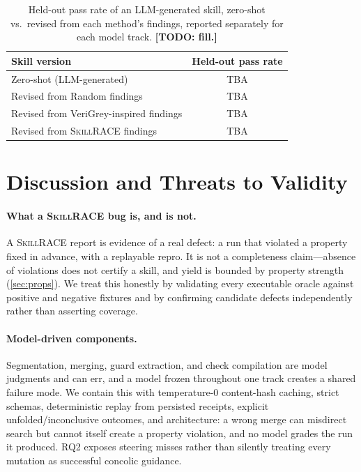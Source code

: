 \documentclass[acmsmall,screen,review,anonymous]{acmart}
\newcommand{\todo}[1]{{\color{purple}\textbf{[TODO: #1]}}}
\newcommand{\ph}[1]{{\color{blue}#1}} %
\newcommand{\tool}{\textsc{SkillRACE}\xspace}
\newcommand{\PassZeroShot}{\ph{TBA}}
\newcommand{\PassRandom}{\ph{TBA}}
\newcommand{\PassGreybox}{\ph{TBA}}
\newcommand{\PassSkillrace}{\ph{TBA}}
\begin{document}
\begin{table}[t]
\centering\small
\caption{Held-out pass rate of an LLM-generated skill, zero-shot vs.\ revised from each
method's findings, reported separately for each model track. \todo{fill.}}
\label{tab:rq3}
\begin{tabular}{@{}l c@{}}
\toprule
\textbf{Skill version} & \textbf{Held-out pass rate}\\
\midrule
Zero-shot (LLM-generated)     & \PassZeroShot\\
Revised from Random findings   & \PassRandom\\
Revised from VeriGrey-inspired findings & \PassGreybox\\
Revised from \tool findings   & \PassSkillrace\\
\bottomrule
\end{tabular}
\end{table}

\section{Discussion and Threats to Validity}
\label{sec:threats}

\paragraph{What a \tool bug is, and is not.} A \tool report is evidence of a real defect:
a run that violated a property fixed in advance, with a replayable repro. It is not a
completeness claim---absence of violations does not certify a skill, and yield is bounded
by property strength (\cref{sec:props}). We treat this honestly by validating every
executable oracle against positive and negative fixtures and by confirming candidate
defects independently rather than asserting coverage.

\paragraph{Model-driven components.} Segmentation, merging, guard extraction, and check
compilation are model judgments and can err, and a model frozen throughout one track
creates a shared failure mode. We contain this with temperature-0 content-hash caching, strict
schemas, deterministic replay from persisted receipts, explicit unfolded/inconclusive
outcomes, and architecture: a wrong merge can misdirect search but cannot itself create a
property violation, and no model grades the run it produced. RQ2 exposes steering misses
rather than silently treating every mutation as successful concolic guidance.
\end{document}
